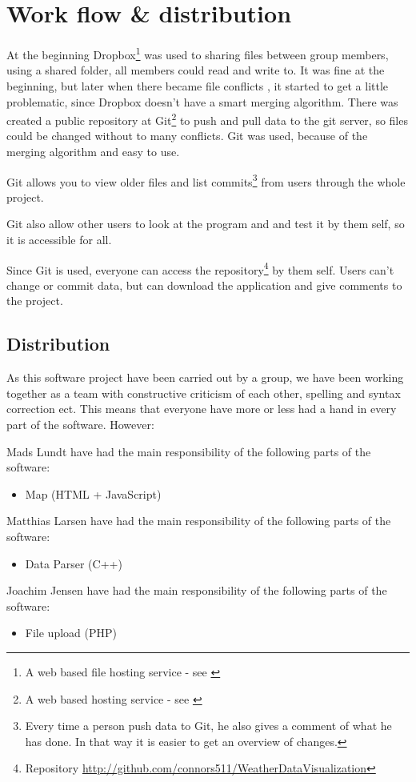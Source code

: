 \chapter{Work flow \& distribution}
At the beginning Dropbox\footnote{A web based file hosting service - see \cite{Dropbox}} was used to sharing files between group members, using a shared folder, all members could read and write to. It was fine at the beginning, but later when there became file conflicts , it started to get a little problematic, since Dropbox doesn't have a smart merging algorithm.
There was created a public repository at Git\footnote{A web based hosting service - see \cite{Git}} to push and pull data to the git server, so files could be changed without to many conflicts. Git was used, because of the merging algorithm and easy to use.

Git allows you to view older files and list commits\footnote{Every time a person push data to Git, he also gives a comment of what he has done. In that way it is easier to get an overview of changes.} from users through the whole project.

Git also allow other users to look at the program and and test it by them self, so it is accessible for all.

Since Git is used, everyone can access the repository\footnote{Repository \url{http://github.com/connors511/WeatherDataVisualization}} by them self. Users can't change or commit data, but can download the application and give comments to the project.

\section{Distribution}
As this software project have been carried out by a group, we have been working together as a team with constructive criticism of each other, spelling and syntax correction ect. This means that everyone have more or less had a hand in every part of the software. However:

Mads Lundt have had the main responsibility of the following parts of the software:
\begin{itemize}
\item Map (HTML + JavaScript)
\end{itemize}

Matthias Larsen have had the main responsibility of the following parts of the software:
\begin{itemize}
\item Data Parser (C++)
\end{itemize}

Joachim Jensen have had the main responsibility of the following parts of the software:
\begin{itemize}
\item File upload (PHP)
\end{itemize}